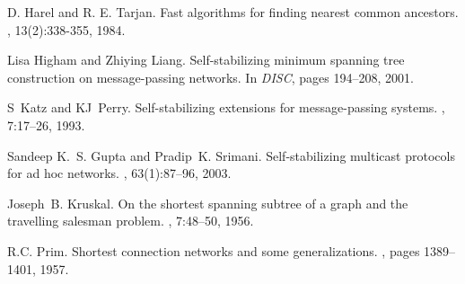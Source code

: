 \documentclass[11pt,a4paper]{article}
\begin{document}
\begin{thebibliography}{10}
D. Harel and R. E. Tarjan.
\newblock Fast algorithms for finding nearest common ancestors. 
, 13(2):338-355, 1984. 

Lisa Higham and Zhiying Liang.
\newblock Self-stabilizing minimum spanning tree construction on
  message-passing networks.
\newblock In {\em DISC}, pages 194--208, 2001.



S~Katz and KJ~Perry.
\newblock Self-stabilizing extensions for message-passing systems.
, 7:17--26, 1993.





Sandeep K.~S. Gupta and Pradip~K. Srimani.
\newblock Self-stabilizing multicast protocols for ad hoc networks.
, 63(1):87--96, 2003.


Joseph~B. Kruskal.
\newblock On the shortest spanning subtree of a graph and the travelling
  salesman problem.
, 7:48--50, 1956.





R.C. Prim.
\newblock Shortest connection networks and some generalizations.
, pages 1389--1401, 1957.





\end{thebibliography}
\end{document}
